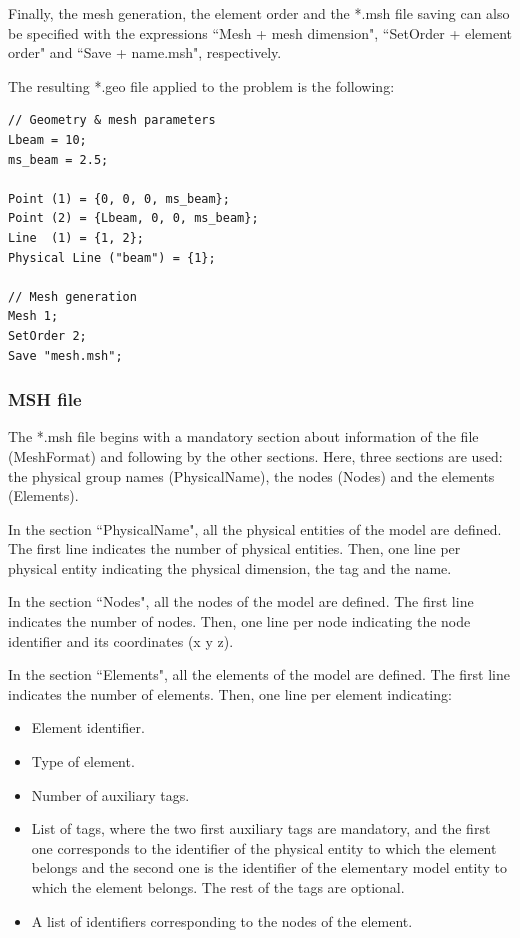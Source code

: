 \documentclass[a4]{article}
\begin{document}
Finally, the mesh generation, the element order and the *.msh file saving can also be specified with the expressions ``Mesh + mesh dimension", ``SetOrder + element order" and ``Save + name.msh", respectively.

The resulting *.geo file applied to the problem is the following:

\begin{Verbatim}
// Geometry & mesh parameters
Lbeam = 10;
ms_beam = 2.5;

Point (1) = {0, 0, 0, ms_beam};
Point (2) = {Lbeam, 0, 0, ms_beam};
Line  (1) = {1, 2};
Physical Line ("beam") = {1};

// Mesh generation
Mesh 1;
SetOrder 2;
Save "mesh.msh";
\end{Verbatim}

\subsubsection{MSH file}

The *.msh file begins with a mandatory section about information of the file (MeshFormat) and following by the other sections. Here, three sections are used: the physical group names (PhysicalName), the nodes (Nodes) and the elements (Elements).

In the section ``PhysicalName", all the physical entities of the model are defined. The first line indicates the number of physical entities. Then, one line per physical entity indicating the physical dimension, the tag and the name.  

In the section ``Nodes", all the nodes of the model are defined. The first line indicates the number of nodes. Then, one line per node indicating the node identifier and its coordinates (x y z).

In the section ``Elements", all the elements of the model are defined. The first line indicates the number of elements. Then, one line per element indicating:


\begin{itemize}
	\item Element identifier.
	\item Type of element.
	\item Number of auxiliary tags.
	\item List of tags, where the two first auxiliary tags are mandatory, and the first one corresponds to the identifier of the physical entity to which the element belongs and the second one is the identifier of the elementary model entity to which the element belongs. The rest of the tags are optional.
	\item A list of identifiers corresponding to the nodes of the element.
\end{itemize}
\end{document}
